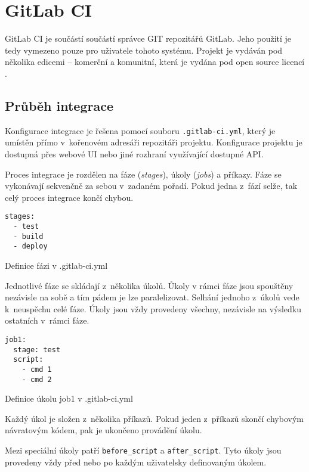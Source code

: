 \chapter{GitLab CI}

GitLab CI je součástí součástí správce GIT repozitářů GitLab.
Jeho použití je tedy vymezeno pouze pro uživatele tohoto systému.
Projekt je vydáván pod několika edicemi -- komerční a komunitní, která je vydána pod open source licencí \cite{gitlab_ce}.

\section{Průběh integrace}

Konfigurace integrace je řešena pomocí souboru \verb|.gitlab-ci.yml|, který je umístěn přímo v~kořenovém adresáři repozitáři projektu.
Konfigurace projektu je dostupná přes webové UI nebo jiné rozhraní využívající dostupné API.

Proces integrace je rozdělen na fáze (\textit{stages}), úkoly (\textit{jobs}) a příkazy.
Fáze se vykonávají sekvenčně za sebou v~zadaném pořadí.
Pokud jedna z~fází selže, tak celý proces integrace končí chybou.

\begin{listing}[ht]
\begin{verbatim}
stages:
  - test
  - build
  - deploy
\end{verbatim}
\caption{Definice fázi v .gitlab-ci.yml}
\end{listing}

Jednotlivé fáze se skládají z~několika úkolů.
Ůkoly v rámci fáze jsou spouštěny nezávisle na sobě a tím pádem je lze paralelizovat.
Selhání jednoho z~úkolů vede k~neuspěchu celé fáze.
Úkoly jsou vždy provedeny všechny, nezávisle na výsledku ostatních v~rámci fáze.

\begin{listing}[ht]
\begin{verbatim}
job1:
  stage: test
  script:
    - cmd 1
    - cmd 2
\end{verbatim}
\caption{Definice úkolu job1 v .gitlab-ci.yml}
\end{listing}

Každý úkol je složen z~několika příkazů.
Pokud jeden z~příkazů skončí chybovým návratovým kódem, pak je ukončeno provádění úkolu.

Mezi speciální úkoly patří \verb|before_script| a \verb|after_script|.
Tyto úkoly jsou provedeny vždy před nebo po každým uživatelsky definovaným úkolem.

